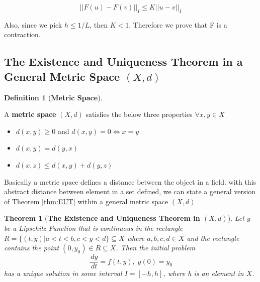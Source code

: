 \documentclass{article}
\newtheorem{theorem}{Theorem}[section]
\theoremstyle{definition}
\newtheorem{definition}{Definition}[section]
\theoremstyle{remark}
\begin{document}
\begin{equation}\label{eqn:contractionI}
    \lvert\lvert F(u) - F(v)\rvert\rvert_{I} \leq K \lvert\lvert u - v \rvert\rvert_{I}
\end{equation}

Also, since we pick $h \leq 1/L$, then $K < 1$. Therefore we prove that F is a contraction.

\subsection{The Existence and Uniqueness Theorem in a General Metric Space $(X,d)$}

\begin{definition}[\textbf{Metric Space}]\label{def:matricSpace}

A \textbf{metric space} $(X,d)$ satisfies the below three properties $\forall x,y \in X$ 
\begin{itemize}
    \item $d(x,y) \geq 0$ and $d(x,y) = 0 \Longleftrightarrow x = y$
    \item $d(x,y) = d(y,x)$
    \item $d(x,z) \leq d(x,y) + d(y,z)$
\end{itemize}

\end{definition}

Basically a metric space defines a distance between the object in a field. with this abstract distance between element in a set defined, we can state a general version of Theorem \ref{thm:EUT} within a general metric space $(X,d)$

\begin{theorem}[\textbf{The Existence and Uniqueness Theorem in $(X,d)$}]\label{thm:EUTXd}
    Let $y$ be a Lipschitz Function that is continuous in the rectangle $R = \{(t,y)|a < t < b, c < y < d\} \subseteq X$ where $a,b,c,d \in X$ and the rectangle contains the point $(0, y_0) \in R \subseteq X$. Then the initial problem
    \begin{equation}
        \dfrac{\,dy}{\,dt} = f(t,y),\; y(0) = y_0
    \end{equation}
has a unique solution in some interval $I = [-h, h]$, where h is an element in $X$.
\end{theorem}

\paragraph{  }
\end{document}
